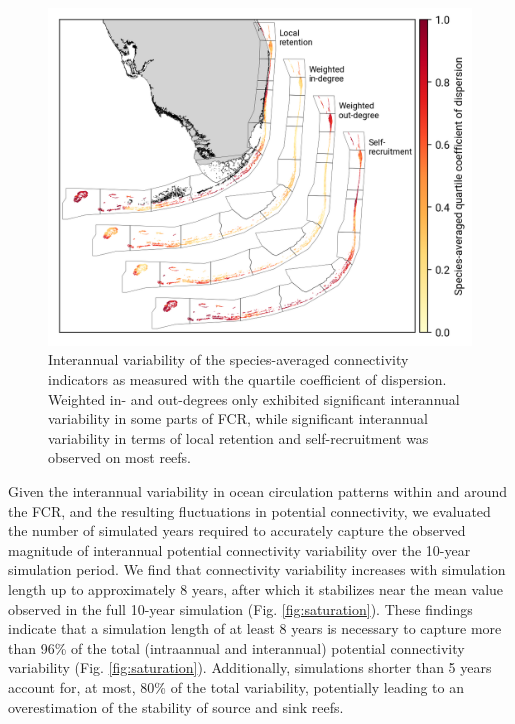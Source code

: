 \documentclass[preprint,12pt,authoryear]{elsarticle}
\begin{document}
\begin{figure}
    \centering
    \includegraphics[width=\textwidth]{figures/species_averaged_quartile_coefficient_of_dispersion.png}
    \caption{Interannual variability of the species-averaged connectivity indicators as measured with the quartile coefficient of dispersion. Weighted in- and out-degrees only exhibited significant interannual variability in some parts of FCR, while significant interannual variability in terms of local retention and self-recruitment was observed on most reefs.
    }\label{fig:variability}

\end{figure}

Given the interannual variability in ocean circulation patterns within and around the FCR, and the resulting fluctuations in potential connectivity, we evaluated the number of simulated years required to accurately capture the observed magnitude of interannual potential connectivity variability over the 10-year simulation period. We find that connectivity variability increases with simulation length up to approximately 8 years, after which it stabilizes near the mean value observed in the full 10-year simulation (Fig. \ref{fig:saturation}). These findings indicate that a simulation length of at least 8 years is necessary to capture more than 96\% of the total (intraannual and interannual) potential connectivity variability (Fig. \ref{fig:saturation}). Additionally, simulations shorter than 5 years account for, at most, 80\% of the total variability, potentially leading to an overestimation of the stability of source and sink reefs.
\end{document}
